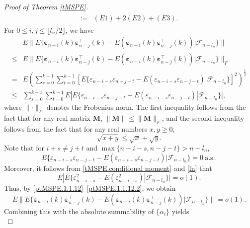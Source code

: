 \documentclass[ejsv2]{imsart}
\theoremstyle{plain}
\theoremstyle{definition}
\theoremstyle{remark}
\begin{document}
\begin{proof}[Proof of Theorem \ref{tMSPE}]
{\begin{align}
\begin{split}
     :=&(E1)+2(E2)+(E3).
\end{split}
\end{align}
For $0\leq i,j\leq\lfloor l_n/2\rfloor$, we have
\begin{equation}\label{ptMSPE.1.1.12}
\begin{split}
    & E\lVert E\{\bm{\varepsilon}_{n-i}(k)\bm{\varepsilon}_{n-j}^\top(k)-E(\bm{\varepsilon}_{n-i}(k)\bm{\varepsilon}_{n-j}^\top(k))|\mathcal{F}_{n-l_n}\}\rVert \\
    \leq & E\lVert E\{\bm{\varepsilon}_{n-i}(k)\bm{\varepsilon}_{n-j}^\top(k)-E(\bm{\varepsilon}_{n-i}(k)\bm{\varepsilon}_{n-j}^\top(k))|\mathcal{F}_{n-l_n}\}\rVert_F\\
    = & E(\sum_{s=0}^{k-1}\sum_{t=0}^{k-1}[E\{\varepsilon_{n-i-s}\varepsilon_{n-j-t}-E(\varepsilon_{n-i-s}\varepsilon_{n-j-t})|\mathcal{F}_{n-l_n}\}]^2)^{\frac{1}{2}}\\
    \leq & \sum_{s=0}^{k-1}\sum_{t=0}^{k-1}E| E\{\varepsilon_{n-i-s}\varepsilon_{n-j-t}-E(\varepsilon_{n-i-s}\varepsilon_{n-j-t})|\mathcal{F}_{n-l_n}\}|,
\end{split}
\end{equation}
where $\lVert \cdot\rVert_F$ denotes the Frobenius norm. The first inequality follows from the fact that for any real matrix $\mathbf{M}$, $\lVert \mathbf{M}\rVert\leq \lVert\mathbf{M}\rVert_F$, and the second inequality follows from the fact that for any real numbers $x,y\geq0$,
\begin{equation*}
\sqrt{x+y}\leq \sqrt{x}+\sqrt{y}.
\end{equation*}
Note that for $i+s\neq j+t$ and $\max\{n-i-s,n-j-t\}>n-l_n$,
\begin{equation}\label{ptMSPE.1.1.12.1}
E\{\varepsilon_{n-i-s}\varepsilon_{n-j-t}-E(\varepsilon_{n-i-s}\varepsilon_{n-j-t})|\mathcal{F}_{n-l_n}\}=0\ \textrm{a.s.}.
\end{equation}
Moreover, it follows from \eqref{tMSPE.conditional moment} and \eqref{ln} that
\begin{equation}\label{ptMSPE.1.1.12.2}
E|E\{\varepsilon_{n-i-s}^2-E(\varepsilon_{n-i-s}^2)|\mathcal{F}_{n-l_n}\}|=o(1).
\end{equation}
Thus, by \eqref{ptMSPE.1.1.12}--\eqref{ptMSPE.1.1.12.2}, we obtain
$$E\lVert E\{\bm{\varepsilon}_{n-i}(k)\bm{\varepsilon}_{n-j}^\top(k)-E(\bm{\varepsilon}_{n-i}(k)\bm{\varepsilon}_{n-j}^\top(k))|\mathcal{F}_{n-l_n}\}\rVert=o(1).$$
Combining this with the absolute summability of $\{\alpha_i\}$ yields
\begin{equation}\label{E1}

\end{equation}}
\end{proof}
\end{document}
